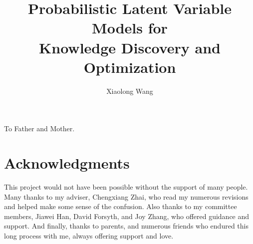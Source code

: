 \documentclass[edeposit,fullpage]{uiucthesis2009}
\theoremstyle{plain}
\theoremstyle{definition}
\theoremstyle{remark}
\begin{document}
\title{Probabilistic Latent Variable Models for  \\
  Knowledge Discovery and Optimization}
\author{Xiaolong Wang}
\phdthesis
{}
\maketitle

\frontmatter



\begin{dedication}
To Father and Mother.
\end{dedication}

\chapter*{Acknowledgments}

This project would not have been possible without the support of many people.
Many thanks to my adviser, Chengxiang Zhai, who read my numerous revisions and
helped make some sense of the confusion. Also thanks to my committee members,
Jiawei Han, David Forsyth, and Joy Zhang, who offered guidance and support.  And
finally, thanks to parents, and numerous friends who endured this long process
with me, always offering support and love.

\end{document}
